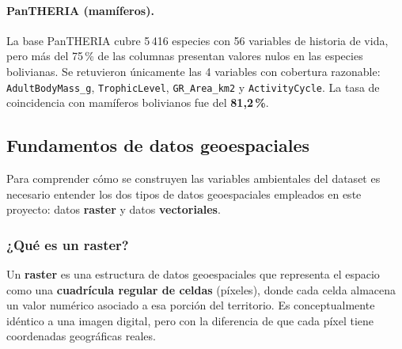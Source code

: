 \documentclass[12pt,a4paper]{article}
\begin{document}
\paragraph{PanTHERIA (mamíferos).}
La base PanTHERIA \cite{jones2009pantheria} cubre 5\,416 especies con 56 variables de historia
de vida, pero más del 75\,\% de las columnas presentan valores nulos en las especies bolivianas.
Se retuvieron únicamente las 4 variables con cobertura razonable:
\texttt{AdultBodyMass\_g}, \texttt{TrophicLevel}, \texttt{GR\_Area\_km2} y \texttt{ActivityCycle}.
La tasa de coincidencia con mamíferos bolivianos fue del \textbf{81,2\,\%}.

\subsection{Fundamentos de datos geoespaciales}

Para comprender cómo se construyen las variables ambientales del dataset es necesario
entender los dos tipos de datos geoespaciales empleados en este proyecto: datos
\textbf{raster} y datos \textbf{vectoriales}.

\subsubsection{¿Qué es un raster?}

Un \textbf{raster} es una estructura de datos geoespaciales que representa el espacio
como una \textbf{cuadrícula regular de celdas} (píxeles), donde cada celda almacena
un valor numérico asociado a esa porción del territorio.
Es conceptualmente idéntico a una imagen digital, pero con la diferencia de que cada
píxel tiene coordenadas geográficas reales.
\end{document}

